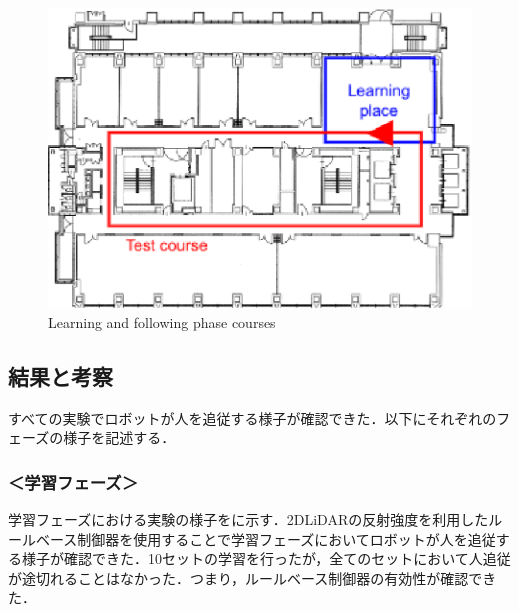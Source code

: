   \begin{figure}[h]
    \centering
    \includegraphics[keepaspectratio, scale=0.70] {images/eps/RobotGuidance_course}
    \captionsetup{justification=raggedright} %
    \caption{Learning and following phase courses}
    \label{Fig:RobotGuidance_course}
  \end{figure}

\newpage

\subsection{結果と考察}

  すべての実験でロボットが人を追従する様子が確認できた．以下にそれぞれのフェーズの様子を記述する．

  \subsubsection*{＜学習フェーズ＞}
  
  学習フェーズにおける実験の様子をに示す．2DLiDARの反射強度を利用したルールベース制御器を使用することで学習フェーズにおいてロボットが人を追従する様子が確認できた．10セットの学習を行ったが，全てのセットにおいて人追従が途切れることはなかった．つまり，ルールベース制御器の有効性が確認できた．

